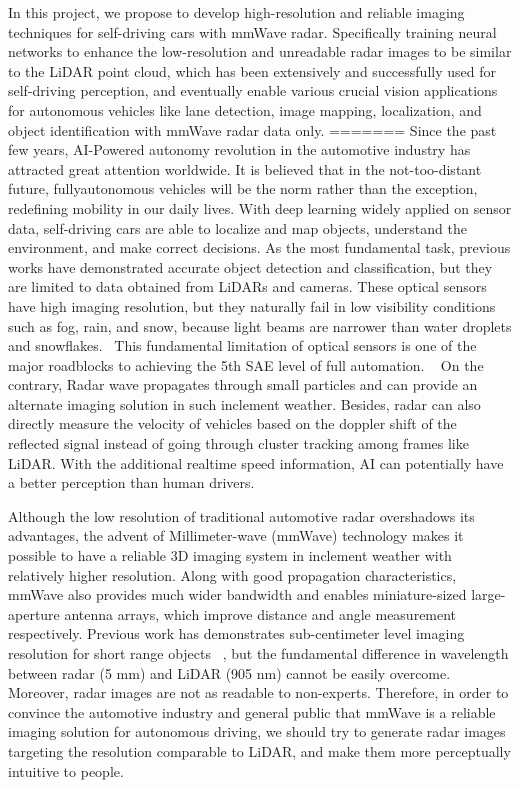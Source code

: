 In this project, we propose to develop high-resolution and reliable imaging techniques for self-driving cars with mmWave radar. Specifically training neural networks to enhance the low-resolution and unreadable radar images to be similar to the LiDAR point cloud, which has been extensively and successfully used for self-driving perception, and eventually enable various crucial vision applications for autonomous vehicles like lane detection, image mapping, localization, and object identification with mmWave radar data only.
=======
Since the past few years, AI-Powered autonomy revolution in the automotive industry has attracted great attention worldwide. It is believed that in the not-too-distant future, fullyautonomous vehicles will be the norm rather than the exception, redefining mobility in our daily lives. With deep learning widely applied on sensor data, self-driving cars are able to localize and map objects, understand the environment, and make correct decisions. As the most fundamental task, previous works have demonstrated accurate object detection and classification, but they are limited to data obtained from LiDARs and cameras. These optical sensors have high imaging resolution, but they naturally fail in low visibility conditions such as fog, rain, and snow, because light beams are narrower than water droplets and snowflakes.~\cite{snow} This fundamental limitation of optical sensors is one of the major roadblocks to achieving the 5th SAE level of full automation. ~\cite{SAE} On the contrary, Radar wave propagates through small particles and can provide an alternate imaging solution in such inclement weather. Besides, radar can also directly measure the velocity of vehicles based on the doppler shift of the reflected signal instead of going through cluster tracking among frames like LiDAR. With the additional realtime speed information, AI can potentially have a better perception than human drivers.

Although the low resolution of traditional automotive radar overshadows its advantages, the advent of Millimeter-wave (mmWave) technology makes it possible to have a reliable 3D imaging system in inclement weather with relatively higher resolution. Along with good propagation characteristics, mmWave also provides much wider bandwidth and enables miniature-sized large-aperture antenna arrays, which improve distance and angle measurement respectively. Previous work has demonstrates sub-centimeter level imaging resolution for short range objects ~\cite{mmWave_SAR}, but the fundamental difference in wavelength between radar (5 mm) and LiDAR (905 nm) cannot be easily overcome. Moreover, radar images are not as readable to non-experts. Therefore, in order to convince the automotive industry and general public that mmWave is a reliable imaging solution for autonomous driving, we should try to generate radar images targeting the resolution comparable to LiDAR, and make them more perceptually intuitive to people. 

